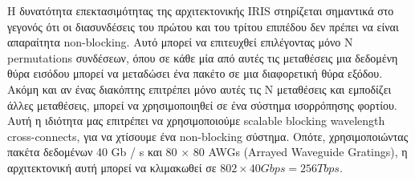 Η δυνατότητα επεκτασιμότητας της αρχιτεκτονικής IRIS στηρίζεται
σημαντικά στο γεγονός ότι οι διασυνδέσεις του πρώτου και του τρίτου
επιπέδου δεν πρέπει να είναι απαραίτητα non-blocking. Αυτό μπορεί να
επιτευχθεί επιλέγοντας μόνο N permutations συνδέσεων, όπου σε κάθε μία
από αυτές τις μεταθέσεις μια δεδομένη θύρα εισόδου μπορεί να μεταδώσει
ένα πακέτο σε μια διαφορετική θύρα εξόδου. Ακόμη και αν ένας διακόπτης
επιτρέπει μόνο αυτές τις N μεταθέσεις και εμποδίζει άλλες μεταθέσεις,
μπορεί να χρησιμοποιηθεί σε ένα σύστημα ισορρόπησης φορτίου.  Αυτή η
ιδιότητα μας επιτρέπει να χρησιμοποιούμε scalable blocking wavelength
cross-connects, για να χτίσουμε ένα non-blocking σύστημα. Οπότε,
χρησιμοποιώντας πακέτα δεδομένων 40 Gb / s και 80 × 80 AWGs (Arrayed
Waveguide Gratings), η αρχιτεκτονική αυτή μπορεί να κλιμακωθεί σε $802
\times 40 Gbps = 256 Tbps$.

